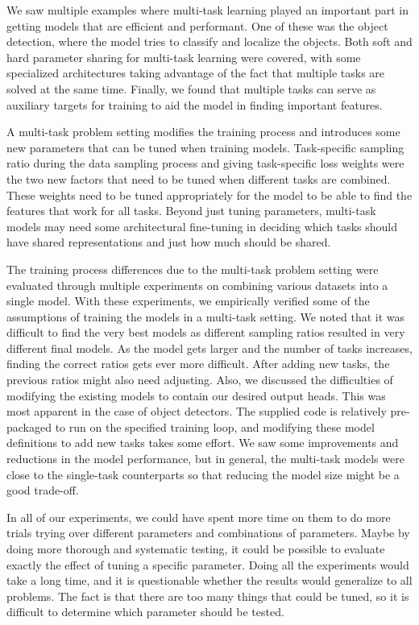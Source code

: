 We saw multiple examples where multi-task learning played an important part in getting models that are efficient and performant.
One of these was the object detection, where the model tries to classify and localize the objects.
Both soft and hard parameter sharing for multi-task learning were covered, with some specialized architectures taking advantage of the fact that multiple tasks are solved at the same time.
Finally, we found that multiple tasks can serve as auxiliary targets for training to aid the model in finding important features.

A multi-task problem setting modifies the training process and introduces some new parameters that can be tuned when training models.
Task-specific sampling ratio during the data sampling process and giving task-specific loss weights were the two new factors that need to be tuned when different tasks are combined.
These weights need to be tuned appropriately for the model to be able to find the features that work for all tasks.
Beyond just tuning parameters, multi-task models may need some architectural fine-tuning in deciding which tasks should have shared representations and just how much should be shared.

The training process differences due to the multi-task problem setting were evaluated through multiple experiments on combining various datasets into a single model.
With these experiments, we empirically verified some of the assumptions of training the models in a multi-task setting.
We noted that it was difficult to find the very best models as different sampling ratios resulted in very different final models.
As the model gets larger and the number of tasks increases, finding the correct ratios gets ever more difficult.
After adding new tasks, the previous ratios might also need adjusting.
Also, we discussed the difficulties of modifying the existing models to contain our desired output heads.
This was most apparent in the case of object detectors. 
The supplied code is relatively pre-packaged to run on the specified training loop, and modifying these model definitions to add new tasks takes some effort.
We saw some improvements and reductions in the model performance, but in general, the multi-task models were close to the single-task counterparts so that reducing the model size might be a good trade-off.

In all of our experiments, we could have spent more time on them to do more trials trying over different parameters and combinations of parameters.
Maybe by doing more thorough and systematic testing, it could be possible to evaluate exactly the effect of tuning a specific parameter.
Doing all the experiments would take a long time, and it is questionable whether the results would generalize to all problems.
The fact is that there are too many things that could be tuned, so it is difficult to determine which parameter should be tested.

